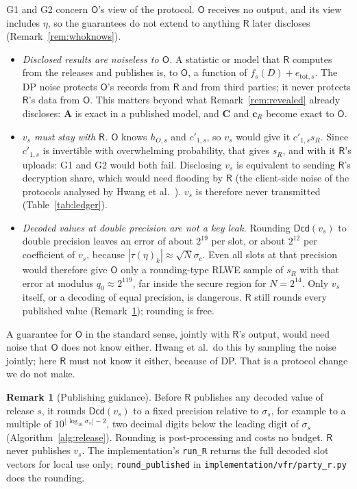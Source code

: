 \documentclass[11pt]{article}
\theoremstyle{definition}
\newtheorem{remark}{Remark}[section]
\theoremstyle{plain}
\newcommand{\Dcd}{\mathsf{Dcd}}
\newcommand{\bA}{\mathbf{A}}
\newcommand{\bC}{\mathbf{C}}
\newcommand{\bcR}{\mathbf{c}_{R}}
\newcommand{\Party}[1]{\textsf{#1}}
\newcommand{\Rp}{\Party{R}}
\newcommand{\Op}{\Party{O}}
\begin{document}
G1 and G2 concern $\Op$'s view of the protocol. $\Op$ receives no output, and its view includes $\eta$, so the guarantees do not extend to anything $\Rp$ later discloses (Remark~\ref{rem:whoknows}).
\begin{itemize}[noitemsep]
  \item \emph{Disclosed results are noiseless to $\Op$.} A statistic or model that $\Rp$ computes from the releases and publishes is, to $\Op$, a function of $f_s(D) + e_{\mathrm{tot},s}$. The DP noise protects $\Op$'s records from $\Rp$ and from third parties; it never protects $\Rp$'s data from $\Op$. This matters beyond what Remark~\ref{rem:revealed} already discloses: $\bA$ is exact in a published model, and $\bC$ and $\bcR$ become exact to $\Op$.
  \item \emph{$v_s$ must stay with $\Rp$.} $\Op$ knows $h_{O,s}$ and $c'_{1,s}$, so $v_s$ would give it $c'_{1,s}s_R$. Since $c'_{1,s}$ is invertible with overwhelming probability, that gives $s_R$, and with it $\Rp$'s uploads: G1 and G2 would both fail. Disclosing $v_s$ is equivalent to sending $\Rp$'s decryption share, which would need flooding by $\Rp$ (the client-side noise of the protocols analysed by Hwang et al.~\cite{hwang2025insecurity}). $v_s$ is therefore never transmitted (Table~\ref{tab:ledger}).
  \item \emph{Decoded values at double precision are not a key leak.} Rounding $\Dcd(v_s)$ to double precision leaves an error of about $2^{19}$ per slot, or about $2^{12}$ per coefficient of $v_s$, because $|\tau(\eta)_k| \approx \sqrt N\sigma_c$. Even all slots at that precision would therefore give $\Op$ only a rounding-type RLWE sample of $s_R$ with that error at modulus $q_0 \approx 2^{119}$, far inside the secure region for $N = 2^{14}$. Only $v_s$ itself, or a decoding of equal precision, is dangerous. $\Rp$ still rounds every published value (Remark~\ref{rem:publish}); rounding is free.
\end{itemize}
A guarantee for $\Op$ in the standard sense, jointly with $\Rp$'s output, would need noise that $\Op$ does not know either. Hwang et al.\ do this by sampling the noise jointly; here $\Rp$ must not know it either, because of DP. That is a protocol change we do not make.

\begin{remark}[Publishing guidance]
\label{rem:publish}
Before $\Rp$ publishes any decoded value of release $s$, it rounds $\Dcd(v_s)$ to a fixed precision relative to $\sigma_s$, for example to a multiple of $10^{\lfloor\log_{10}\sigma_s\rfloor - 2}$, two decimal digits below the leading digit of $\sigma_s$ (Algorithm~\ref{alg:release}). Rounding is post-processing and costs no budget. $\Rp$ never publishes $v_s$. The implementation's \texttt{run\_R} returns the full decoded slot vectors for local use only; \texttt{round\_published} in \texttt{implementation/vfr/party\_r.py} does the rounding.
\end{remark}
\end{document}
